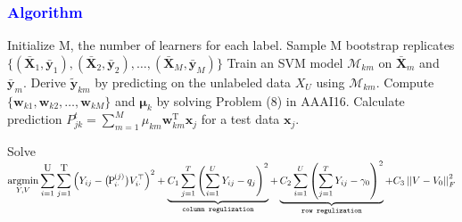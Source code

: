 \documentclass{beamer}
\newcommand{\tikzmark}[3][]{\tikz[overlay,remember picture,baseline] \node [anchor=base,#1](#2) {#3};}
\DeclareMathOperator*{\argmin}{argmin}
\begin{document}
\begin{frame}[allowframebreaks]%
\frametitle{\textcolor{blue}{Algorithm}}
\begin{algorithmic}[1]
\STATE Initialize M, the number of learners for each label.
\STATE Sample M bootstrap replicates $\{(\bar{\textbf{X}}_1, \bar{\textbf{y}}_1), (\bar{\textbf{X}}_2, \bar{\textbf{y}}_2), \dots, (\bar{\textbf{X}}_M, \bar{\textbf{y}}_M)\}$
\STATE Train an SVM model $\mathcal{M}_{km}$ on $\bar{\textbf{X}}_m$ and $\bar{\textbf{y}}_m$. 
\STATE \small Derive $\boldsymbol{\tilde{y}}_{km}$ by predicting on the unlabeled data $X_U$ using $\mathcal{M}_{km}$.
\ENDFOR
\STATE \small Compute $\{\textbf{w}_{k1}, \textbf{w}_{k2}, \dots, \textbf{w}_{kM}\}$ and $\boldsymbol{\mu}_k$ by solving Problem (8) in AAAI16.
\STATE \small Calculate prediction $P_{jk}^{t} = \sum_{m=1}^M \mu_{km}\textbf{w}_{km}^{\mathrm{T}}\textbf{x}_j$ for a test data $\textbf{x}_j$.
\ENDFOR
\ENDFOR

\STATE Solve
$
\displaystyle\argmin_{Y, V} \displaystyle\sum_{i=1}^{\tikzmark{U}{U}}\displaystyle\sum_{j=1}^{\tikzmark{T}{T}}\left(Y_{ij} - \big(\,\,\,\tikzmark{P}{P\,\,\,}_{i  \cdot }^{(j)}\big)V_{i\cdot }^\top \right)^2 + \underbrace{C_1\displaystyle\sum_{j=1}^{T}\left(\displaystyle\sum_{i=1}^{U}Y_{ij} - q_j\right)^2}_{\texttt{column regulization}} + \underbrace{C_2\displaystyle\sum_{i=1}^{U}\left(\displaystyle\sum_{j=1}^{T}Y_{ij} - \gamma_0\right)^2}_{\texttt{row regulization}}  + C_3\left|\left|V - V_0\right|\right|_F^2
$

\end{algorithmic}


\end{frame}
\end{document}
